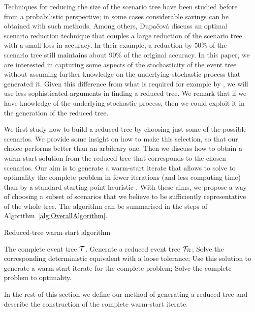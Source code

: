 Techniques for reducing the size of the scenario tree have been studied 
before from a probabilistic perspective; in some cases considerable 
savings can be obtained with such methods. Among others, 
Dupa\v{c}ov{\'a} \etal \cite{Dupacova} discuss an optimal scenario 
reduction technique that couples a large reduction of the scenario 
tree with a small loss in accuracy. In their example, a reduction by 
50\% of the scenario tree still maintains about 90\% of the original 
accuracy.
In this paper, we are interested in capturing some aspects of the 
stochasticity of the event tree without assuming further knowledge on 
the underlying stochastic process that generated it. Given this difference 
from what is required for example by \cite{Dupacova}, we will use less 
sophisticated arguments in finding a reduced tree.
We remark that if we have knowledge of the underlying stochastic process,
then we could exploit it in the generation of the reduced tree.

We first study how to build a reduced tree by choosing just 
some of the possible scenarios. We provide some insight on how to make 
this selection, so that our choice performs better than an arbitrary 
one.
Then we discuss how to obtain a warm-start solution from the reduced 
tree that corresponds to the chosen scenarios.
Our aim is to generate a warm-start iterate that allows to solve to 
optimality the complete problem in fewer iterations (and less computing 
time) than by a standard starting point heuristic \cite{Mehrotra92}.
With these aims, we propose a way of choosing a subset of scenarios 
that we believe to be sufficiently representative of the whole tree.
The algorithm can be summarised in the steps of
Algorithm~\ref{alg:OverallAlgorithm}.
%
\begin{algorithm}[h]
  \caption{Reduced-tree warm-start algorithm}
  \begin{algorithmic}[0]  \label{alg:OverallAlgorithm}
    \REQUIRE The complete event tree $\mathcal{T}$.
    \smallskip
    \STATE Generate a reduced event tree $\mathcal{T}_\mathcal{R}$;
    \smallskip
    \STATE Solve the corresponding deterministic equivalent with a loose 
           tolerance;
    \smallskip
    \STATE Use this solution to generate a warm-start iterate for the 
    complete problem;
    \smallskip
    \STATE Solve the complete problem to optimality.
  \end{algorithmic}
\end{algorithm}

In the rest of this section we define our method of generating a 
reduced tree and describe the construction of the complete warm-start 
iterate.


